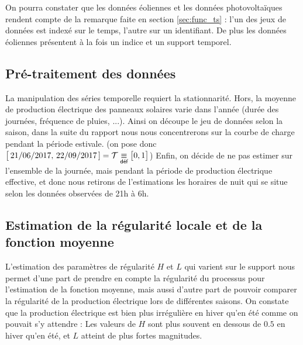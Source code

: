 \bigskip

\begin{rem}
	On pourra constater que les données éoliennes et les données photovoltaïques rendent compte de la remarque faite en section \ref{sec:func_ts} : l'un des jeux de données est indexé sur le temps, l'autre sur un identifiant. De plus les données éoliennes présentent à la fois un indice et un support temporel.
\end{rem}


\subsection{Pré-traitement des données}

La manipulation des séries temporelle requiert la stationnarité. Hors, la moyenne de production électrique des panneaux solaires varie dans l'année (durée des journées, fréquence de pluies, ...). Ainsi on découpe le jeu de données selon la saison, dans la suite du rapport nous nous concentrerons sur la courbe de charge pendant la période estivale. (on pose donc $\bigl[ \, 21/06/2017, \, 22/09/2017 \, ] = \mathcal T \isdef \bigl[ 0, 1 \bigr]$) Enfin, on décide de ne pas estimer sur l'ensemble de la journée, mais pendant la période de production électrique effective, et donc nous retirons de l'estimations les horaires de nuit qui se situe selon les données observées de 21h à 6h.


\subsection{Estimation de la régularité locale et de la fonction moyenne}


L'estimation des paramètres de régularité $H$ et $L$  qui varient sur le support nous permet d'une part de prendre en compte la régularité du processus pour l'estimation de la fonction moyenne, mais aussi d'autre part de pouvoir comparer la régularité de la production électrique lors de différentes saisons.
On constate que la production électrique est bien plus irrégulière en hiver qu'en été comme on pouvait s'y attendre : Les valeurs de $H$ sont plus souvent en dessous de $0.5$ en hiver qu'en été, et $L$ atteint de plus fortes magnitudes.

